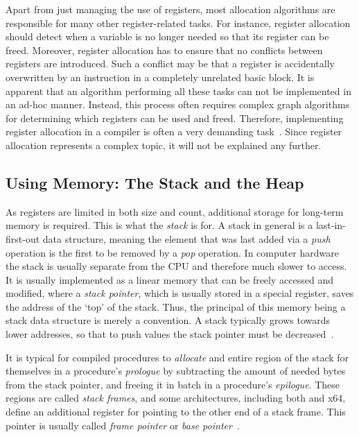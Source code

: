 Apart from just managing the use of registers, most allocation algorithms are responsible for many other register-related tasks.
For instance, register allocation should detect when a variable is no longer needed so that its register can be freed.
Moreover, register allocation has to ensure that no conflicts between registers are introduced.
Such a conflict may be that a register is accidentally overwritten by an instruction in a completely unrelated basic block.
It is apparent that an algorithm performing all these tasks can not be implemented in an ad-hoc manner.
Instead, this process often requires complex graph algorithms for determining which registers can be used and freed.
Therefore, implementing register allocation in a compiler is often a very demanding task~\cite[pp.212-214]{Watson2017}.
Since register allocation represents a complex topic, it will not be explained any further.

\subsection{Using Memory: The Stack and the Heap}

As registers are limited in both size and count, additional storage for long-term memory is required.
This is what the \emph{stack} is for.
A stack in general is a last-in-first-out data structure, meaning the element that was last added via a \emph{push} operation is the first to be removed by a \emph{pop} operation.
In computer hardware the stack is usually separate from the CPU and therefore much slower to access.
It is usually implemented as a linear memory that can be freely accessed and modified, where a \emph{stack pointer}, which is usually stored in a special register, saves the address of the `top' of the stack.
Thus, the principal of this memory being a stack data structure is merely a convention.
A stack typically grows towards lower addresses, so that to push values the stack pointer must be decreased~\cite[pp.~68,99,100]{Patterson2017-zq}.

It is typical for compiled procedures to \emph{allocate} and entire region of the stack for themselves in a procedure's \emph{prologue} by subtracting the amount of needed bytes from the stack pointer, and freeing it in batch in a procedure's \emph{epilogue}.
These regions are called \emph{stack frames}, and some architectures, including both \riscv{} and x64, define an additional register for pointing to the other end of a stack frame.
This pointer is usually called \emph{frame pointer} or \emph{base pointer}~\cite[p.~94]{Waldron1998}.

